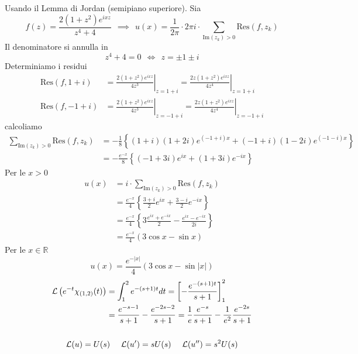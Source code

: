 Usando il Lemma di Jordan (semipiano superiore). Sia
\begin{equation*}
f( z) =\frac{2\left( 1+z^{2}\right) e^{ixz}}{z^{4} +4} \ \ \implies \ \ u( x) =\frac{1}{2\pi } \cdotp 2\pi i\cdotp \sum _{\mathrm{Im}( z_{k})  >0}\mathrm{Res}( f,z_{k})
\end{equation*}
Il denominatore si annulla in
\begin{equation*}
z^{4} +4=0\ \ \iff \ \ z=\pm 1\pm i
\end{equation*}
Determiniamo i residui
\begin{align*}
\mathrm{Res}( f,1+i) & =\left. \frac{2\left( 1+z^{2}\right) e^{ixz}}{4z^{3}}\right| _{z=1+i} =\left. \frac{2z\left( 1+z^{2}\right) e^{ixz}}{4z^{4}}\right| _{z=1+i}\\
\mathrm{Res}( f,-1+i) & =\left. \frac{2\left( 1+z^{2}\right) e^{ixz}}{4z^{3}}\right| _{z=-1+i} =\left. \frac{2z\left( 1+z^{2}\right) e^{ixz}}{4z^{4}}\right| _{z=-1+i}
\end{align*}
calcoliamo
\begin{align*}
\sum _{\mathrm{Im}( z_{k})  >0}\mathrm{Res}( f,z_{k}) & =-\frac{1}{8}\left\{( 1+i)( 1+2i) e^{( -1+i) x} +( -1+i)( 1-2i) e^{( -1-i) x}\right\}\\
 & =-\frac{e^{-x}}{8}\left\{( -1+3i) e^{ix} +( 1+3i) e^{-ix}\right\}
\end{align*}
Per le $x >0$
\begin{align*}
u( x) & =i\cdotp \sum _{\mathrm{Im}( z_{k})  >0}\mathrm{Res}( f,z_{k})\\
 & =\frac{e^{-x}}{4}\left\{\frac{3+i}{2} e^{ix} +\frac{3-i}{2} e^{-ix}\right\}\\
 & =\frac{e^{-x}}{4}\left\{3\frac{e^{ix} +e^{-ix}}{2} -\frac{e^{ix} -e^{-ix}}{2i}\right\}\\
 & =\frac{e^{-x}}{4}( 3\cos x-\sin x)
\end{align*}
Per le $x\in \mathbb{R}$
\begin{equation*}
u( x) =\frac{e^{-| x| }}{4}( 3\cos x-\sin| x| )
\end{equation*}
\Soluzione
\begin{gather*}
\begin{aligned}
\mathcal{L}\left( e^{-t} \chi _{( 1,2)}( t)\right) & =\int ^{2}_{1} e^{-( s+1) t} dt=\left[ -\frac{e^{-( s+1) t}}{s+1}\right]^{2}_{1}\\
 & =\frac{e^{-s-1}}{s+1} -\frac{e^{-2s-2}}{s+1} =\frac{1}{e}\frac{e^{-s}}{s+1} -\frac{1}{e^{2}}\frac{e^{-2s}}{s+1}
\end{aligned}\\
\\
\mathcal{L}( u) =U( s) \ \ \ \ \mathcal{L}( u') =sU( s) \ \ \ \ \mathcal{L}( u'') =s^{2} U( s)
\end{gather*}

